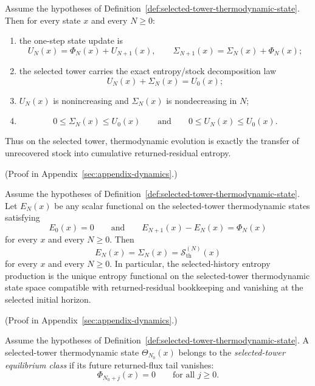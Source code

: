 \begin{theorem}
\label{thm:selected-tower-thermodynamic-state-law}
Assume the hypotheses of
Definition~\ref{def:selected-tower-thermodynamic-state}. Then for every state
\(x\) and every \(N\ge 0\):
\begin{enumerate}[label=(\roman*), leftmargin=2em, itemsep=0.2em]
\item the one-step state update is
      \[
      U_N(x)=\Phi_N(x)+U_{N+1}(x),
      \qquad
      \Sigma_{N+1}(x)=\Sigma_N(x)+\Phi_N(x);
      \]
\item the selected tower carries the exact entropy/stock decomposition law
      \[
      U_N(x)+\Sigma_N(x)=U_0(x);
      \]
\item \(U_N(x)\) is nonincreasing and \(\Sigma_N(x)\) is nondecreasing in
      \(N\);
\item
      \[
      0\le \Sigma_N(x)\le U_0(x)
      \qquad\text{and}\qquad
      0\le U_N(x)\le U_0(x).
      \]
\end{enumerate}
Thus on the selected tower, thermodynamic evolution is exactly the transfer of
unrecovered stock into cumulative returned-residual entropy.
\end{theorem}

(Proof in Appendix~\ref{sec:appendix-dynamics}.)

\begin{theorem}
\label{thm:canonical-selected-tower-entropy-functional}
Assume the hypotheses of
Definition~\ref{def:selected-tower-thermodynamic-state}. Let
\(E_N(x)\) be any scalar functional on the selected-tower thermodynamic states
satisfying
\[
E_0(x)=0
\qquad\text{and}\qquad
E_{N+1}(x)-E_N(x)=\Phi_N(x)
\]
for every \(x\) and every \(N\ge 0\). Then
\[
E_N(x)=\Sigma_N(x)=\mathcal S_{\mathrm{th}}^{(N)}(x)
\]
for every \(x\) and every \(N\ge 0\). In particular, the selected-history
entropy production is the unique entropy functional on the selected-tower
thermodynamic state space compatible with returned-residual bookkeeping and
vanishing at the selected initial horizon.
\end{theorem}

(Proof in Appendix~\ref{sec:appendix-dynamics}.)

\begin{definition}
\label{def:selected-tower-equilibrium-class}
Assume the hypotheses of
Definition~\ref{def:selected-tower-thermodynamic-state}. A selected-tower
thermodynamic state \(\Theta_{N_0}(x)\) belongs to the
\emph{selected-tower equilibrium class} if its future returned-flux tail
vanishes:
\[
\Phi_{N_0+j}(x)=0
\qquad\text{for all } j\ge 0.
\]
\end{definition}

